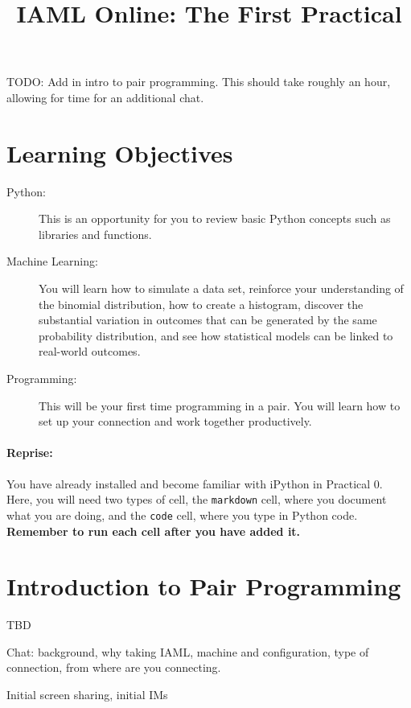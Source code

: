 \documentclass{article}
\begin{document}
\title{IAML Online: The First Practical}

\maketitle

TODO: Add in intro to pair programming. This should take roughly an hour, allowing for time for an additional chat. 

\section{Learning Objectives}


\begin{description}
	\item[Python:] This is an opportunity for you to review basic Python concepts such as libraries and functions.
	\item[Machine Learning:] You will learn how to simulate a data set, reinforce your understanding of the binomial distribution, how to create a histogram, discover the substantial variation in outcomes that can be generated by the same probability distribution, and see how statistical models can be linked to real-world outcomes. 
	\item[Programming:] This will be your first time programming in a pair. You will learn how to set up your connection and work together productively.
\end{description}
	  

\paragraph{Reprise:} You have already installed and become familiar with iPython in Practical 0. Here, you will need two types of cell, the \texttt{markdown} cell, where you document what you are doing, and the \texttt{code} cell, where you type in Python code. \textbf{Remember to run each cell after you have added it.}

\section{Introduction to Pair Programming}

TBD

Chat: background, why taking IAML, machine and configuration, type of connection, from where are you connecting.

Initial screen sharing, initial IMs
\end{document}
